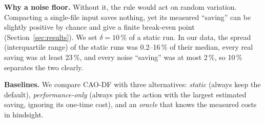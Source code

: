 \textbf{Why a noise floor.} Without it, the rule would act on random variation. Compacting a
single-file input saves nothing, yet its measured ``saving'' can be slightly positive by chance
and give a finite break-even point (Section~\ref{sec:results}). We set $\delta = 10\,\%$ of a
static run. In our data, the spread (interquartile range) of the static runs was 0.2--16\,\%
of their median, every real saving was at least 23\,\%, and every noise ``saving'' was at most
2\,\%, so 10\,\% separates the two clearly.

\textbf{Baselines.} We compare CAO-DF with three alternatives: \emph{static} (always keep the
default), \emph{performance-only} (always pick the action with the largest estimated saving,
ignoring its one-time cost), and an \emph{oracle} that knows the measured costs in hindsight.
